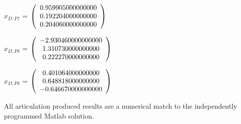 \begin{description}
$\hat{x}_{D:F7}$  = $\left( \begin{array} {ccc} 0.959905000000000 \\ 0.192204000000000 \\ 0.204060000000000
\end{array} \right)\\ \\$

$x_{D:F8}$  = $\left( \begin{array} {ccc} -2.930460000000000 \\ 1.310730000000000 \\ 0.222270000000000
\end{array} \right)\\ \\$

$\hat{x}_{D:F8}$  = $\left( \begin{array} {ccc} 0.401064000000000 \\ 0.648818000000000 \\ -0.646670000000000
\end{array} \right)\\ \\$

All \ModelDesc articulation produced results are a numerical match to the
independently programmed Matlab solution.


\end{description}

\newpage

\boilerplatetraceability

\newpage
\boilerplatemetrics
